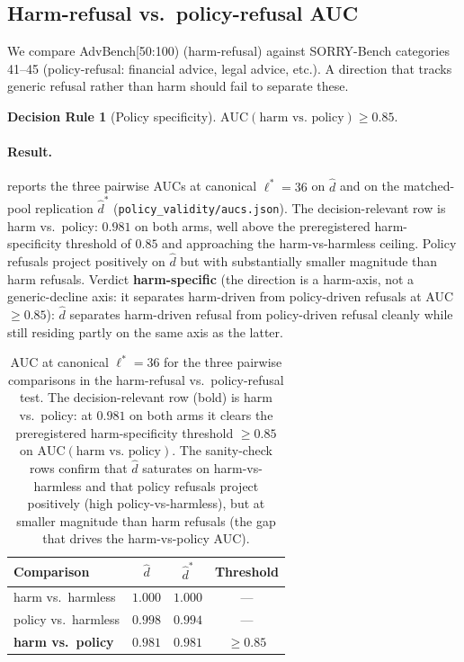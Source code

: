 \documentclass[10pt,twocolumn]{article}
\newcommand{\dhat}{\hat{d}}
\newcommand{\dhatstar}{\hat{d}^{*}}
\newcommand{\layerL}{\ell}
\newcommand{\Lread}{\layerL^{*}}
\newcommand{\advbench}{AdvBench}
\newcommand{\sorrybench}{SORRY-Bench}
\theoremstyle{definition}
\newtheorem{decisionrule}{Decision Rule}
\begin{document}
\subsection{Harm-refusal vs.\ policy-refusal AUC}
\label{sec:validity-policy}

We compare \advbench{}[50:100) (harm-refusal) against \sorrybench{}
\citep{xie2024sorrybench} categories 41--45 (policy-refusal: financial
advice, legal advice, etc.). A direction that tracks generic refusal
rather than harm should fail to separate these.

\begin{decisionrule}[Policy specificity]
\label{rule:policy}
$\mathrm{AUC}(\text{harm vs.\ policy}) \geq 0.85$.
\end{decisionrule}

\paragraph{Result.}
 reports the three pairwise AUCs at canonical
$\Lread{=}36$ on $\dhat$ and on the matched-pool replication
$\dhatstar$ (\texttt{policy\_validity/aucs.json}). The
decision-relevant row is harm vs.\ policy: $0.981$ on both arms,
well above the preregistered harm-specificity threshold of $0.85$ and
approaching the harm-vs-harmless ceiling. Policy refusals project
positively on $\dhat$ but with substantially smaller magnitude than
harm refusals. Verdict \textbf{harm-specific} (the direction is a
harm-axis, not a generic-decline axis: it separates harm-driven from
policy-driven refusals at AUC${\geq}0.85$): $\dhat$ separates
harm-driven refusal from policy-driven refusal cleanly while still
residing partly on the same axis as the latter.

\begin{table}[t]
\centering\small
\begin{tabular}{lccc}
\toprule
Comparison & $\dhat$ & $\dhatstar$ & Threshold \\
\midrule
harm vs.\ harmless    & $1.000$ & $1.000$ & --- \\
policy vs.\ harmless  & $0.998$ & $0.994$ & --- \\
\textbf{harm vs.\ policy} & $\bm{0.981}$ & $\bm{0.981}$ & $\geq 0.85$ \\
\bottomrule
\end{tabular}
\caption{AUC at canonical $\Lread{=}36$ for the three pairwise
comparisons in the harm-refusal vs.\ policy-refusal test. The
decision-relevant row (bold) is harm vs.\ policy: at $0.981$ on
both arms it clears the preregistered harm-specificity threshold
$\geq 0.85$ on $\mathrm{AUC}(\text{harm vs.\ policy})$. The
sanity-check rows confirm that $\dhat$ saturates on harm-vs-harmless
and that policy refusals project positively (high
policy-vs-harmless), but at smaller magnitude than harm refusals
(the gap that drives the harm-vs-policy AUC).}
\label{tab:policy-aucs}
\end{table}
\end{document}
